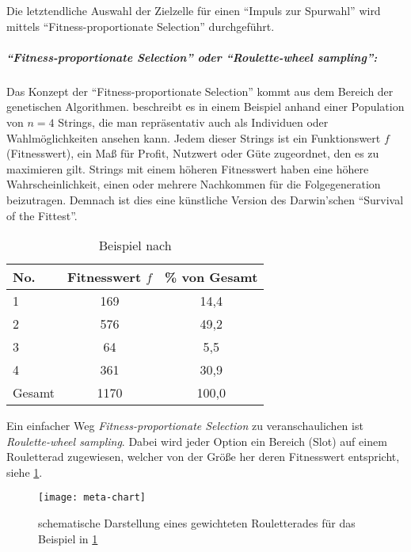 Die letztendliche Auswahl der Zielzelle für einen \enquote{Impuls zur Spurwahl} wird mittels \enquote{Fit\-ness-proportionate Selection} durchgeführt.


\subparagraph{\enquote{Fitness-proportionate Selection} oder \enquote{Roulette-wheel sampling}:}

Das Konzept der \enquote{Fitness-proportionate Selection} kommt aus dem Bereich der genetischen Algorithmen. 
\cite{gen-algo} beschreibt es in einem Beispiel anhand einer Population von $n=4$ Strings, die man repräsentativ auch als Individuen oder Wahlmöglichkeiten ansehen kann. 
Jedem dieser Strings ist ein Funktionswert $f$ (Fitnesswert), ein Maß für Profit, Nutzwert oder Güte zugeordnet, den es zu maximieren gilt. 
Strings mit einem höheren Fitnesswert haben eine höhere Wahrscheinlichkeit, einen oder mehrere Nachkommen für die Folgegeneration beizutragen.
Demnach ist dies eine künstliche Version des Darwin'schen \enquote{Survival of the Fittest}.

\begin{table}[ht]
\begin{center}
\setlength{\tabcolsep}{0.5em} %
{\renewcommand{\arraystretch}{1.2}%
\begin{tabular}{| l  c  c |}
\hline 
No. & Fitnesswert $f$ & \% von Gesamt \\ \hline 
1 & 169 & 14,4 \\ 
2 & 576 & 49,2 \\ 
3 & 64 & 5,5 \\ 
4 & 361 & 30,9 \\ \hline
Gesamt & 1170 & 100,0 \\ \hline
\end{tabular}
}
\caption{Beispiel nach \cite[Table 1.1]{gen-algo}}
\label{tab:beispiel-tabelle-roulette}
\end{center}
\end{table}

Ein einfacher Weg \textit{Fitness-proportionate Selection} zu veranschaulichen ist \textit{Roulette-wheel sampling}. 
Dabei wird jeder Option ein Bereich (Slot) auf einem Rouletterad zugewiesen, welcher von der Größe her deren Fitnesswert entspricht, siehe \cref{figure:meta-chart}. 

\begin{figure}[hptb]
 \centering
 \texttt{[image: meta-chart]}
 \caption[gewichtetes Roulette-Rad (fitness-proportionate selection)]
 		{schematische Darstellung eines gewichteten Rouletterades für das Beispiel in \cref{tab:beispiel-tabelle-roulette}}
 \label{figure:meta-chart}
\end{figure}

